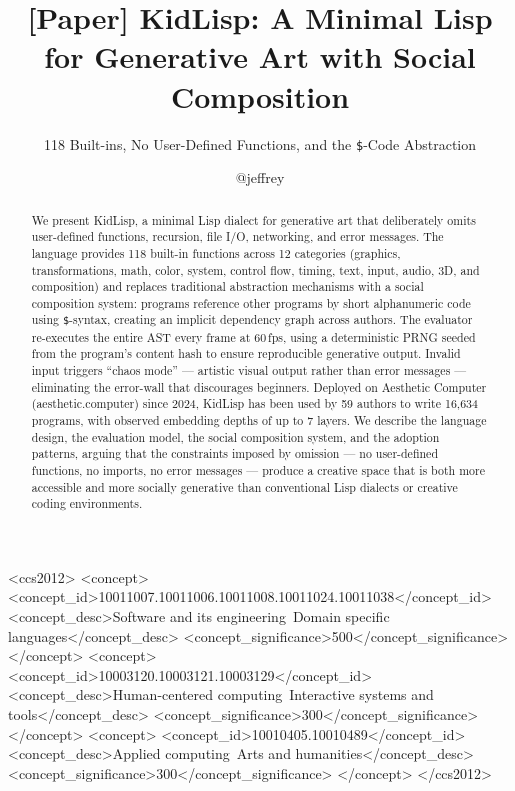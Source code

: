 \documentclass[sigconf,nonacm]{acmart}
\begin{document}
\title{[Paper] KidLisp: A Minimal Lisp for Generative Art with Social Composition}
\subtitle{118 Built-ins, No User-Defined Functions, and the \texttt{\$}-Code Abstraction}

\author{@jeffrey}

\begin{abstract}
We present KidLisp, a minimal Lisp dialect for generative art that deliberately omits user-defined functions, recursion, file I/O, networking, and error messages. The language provides 118 built-in functions across 12 categories (graphics, transformations, math, color, system, control flow, timing, text, input, audio, 3D, and composition) and replaces traditional abstraction mechanisms with a social composition system: programs reference other programs by short alphanumeric code using \texttt{\$}-syntax, creating an implicit dependency graph across authors. The evaluator re-executes the entire AST every frame at 60\,fps, using a deterministic PRNG seeded from the program's content hash to ensure reproducible generative output. Invalid input triggers ``chaos mode'' --- artistic visual output rather than error messages --- eliminating the error-wall that discourages beginners. Deployed on Aesthetic Computer (aesthetic.computer) since 2024, KidLisp has been used by 59 authors to write 16,634 programs, with observed embedding depths of up to 7 layers. We describe the language design, the evaluation model, the social composition system, and the adoption patterns, arguing that the constraints imposed by omission --- no user-defined functions, no imports, no error messages --- produce a creative space that is both more accessible and more socially generative than conventional Lisp dialects or creative coding environments.
\end{abstract}

\begin{CCSXML}
<ccs2012>
  <concept>
    <concept_id>10011007.10011006.10011008.10011024.10011038</concept_id>
    <concept_desc>Software and its engineering~Domain specific languages</concept_desc>
    <concept_significance>500</concept_significance>
  </concept>
  <concept>
    <concept_id>10003120.10003121.10003129</concept_id>
    <concept_desc>Human-centered computing~Interactive systems and tools</concept_desc>
    <concept_significance>300</concept_significance>
  </concept>
  <concept>
    <concept_id>10010405.10010489</concept_id>
    <concept_desc>Applied computing~Arts and humanities</concept_desc>
    <concept_significance>300</concept_significance>
  </concept>
</ccs2012>
\end{CCSXML}
\end{document}
